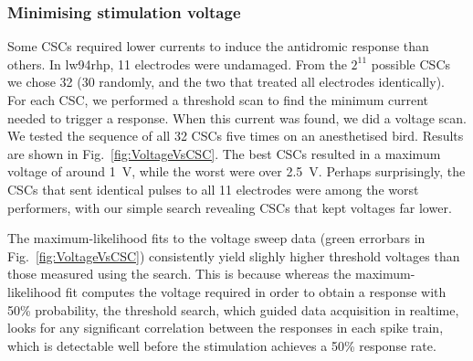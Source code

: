 \documentclass[10pt,letterpaper]{article}
\newcommand\fig[1]{Fig.~\ref{#1}}
\newcommand{\noprint}[1]{}
\begin{document}
\subsubsection{Minimising stimulation voltage}

Some CSCs required lower currents to induce the antidromic response
than others. In lw94rhp, 11 electrodes were undamaged. From the
$2^{11}$ possible CSCs we chose 32 (30 randomly, and the two that
treated all electrodes identically).  For each CSC, we performed a
threshold scan to find the minimum current needed to trigger a
response.  When this current was found, we did a voltage scan.  We
tested the sequence of all 32 CSCs five times on an anesthetised bird.  Results are shown
in \fig{fig:VoltageVsCSC}.  The best CSCs resulted in a maximum
voltage of around 1~V, while the worst were over 2.5~V.  Perhaps
surprisingly, the CSCs that sent identical pulses to all 11 electrodes
were among the worst performers, with our simple search revealing CSCs
that kept voltages far lower.

The maximum-likelihood fits to the voltage sweep data (green errorbars
in \fig{fig:VoltageVsCSC}) consistently yield slighly higher threshold
voltages than those measured using the search.  This is because
whereas the maximum-likelihood fit computes the voltage required in
order to obtain a response with 50\% probability, the threshold
search, which guided data acquisition in realtime, looks for any
significant correlation between the responses in each spike train,
which is detectable well before the stimulation achieves a 50\%
response rate.

\noprint{FIXME: The following caveat doesn't apply to
  lw95rhp-2015-12-04: Each threshold scan terminated when a
  stimulation voltage over 3 V was detected, so for some datasets
  (e.g. lw95rhp-2015-12-09) we were unable to acquire all five
  measurements for some CSCs, and thus they are worse than the figure
  shows.}
\end{document}
